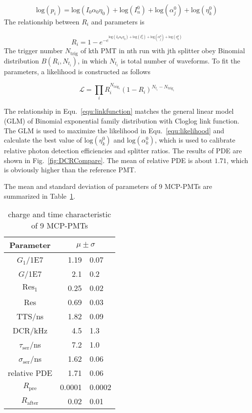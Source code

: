 \begin{equation}
    \label{equ:pdelograte}
    \mathrm{log}(p_{i})=\mathrm{log}(I_0\alpha_0\eta_0)+\mathrm{log}(I_n^0)+\mathrm{log}(\alpha_j^0)+\mathrm{log}(\eta_k^0)
\end{equation}
The relationship between $R_{i}$ and parameters is

\begin{equation}
    \label{equ:linkfunction}
    R_{i}=1-e^{-e^{\mathrm{log}(I_0\alpha_0\eta_0)+\mathrm{log}(I_n^0)+\mathrm{log}(\alpha_j^0)+\mathrm{log}(\eta_k^0)}}
\end{equation}
The trigger number $N_{\mathrm{trig}}$ of kth PMT in nth run with jth splitter obey Binomial distribution $B(R_{i},N_{t_{i}})$, in which $N_{t_{i}}$ is total number of waveforms. To fit the parameters, a likelihood is constructed as follows

\begin{equation}
    \label{equ:likelihood}
    \mathcal{L}=\prod_{i}{R_{i}^{N_{\mathrm{trig}_{i}}}(1-R_{i})^{N_{t_{i}}-N_{\mathrm{trig}_{i}}}}
\end{equation}

The relationship in Equ.~\eqref{equ:linkfunction} matches the general linear model (GLM) of Binomial exponential family distribution with Cloglog link function\cite{glm}. The GLM is used to maximize the likelihood in Equ.~\eqref{equ:likelihood} and calculate the best value of $\mathrm{log}(\eta_k^0)$ and $\mathrm{log}(\alpha_k^0)$, which is used to calibrate relative photon detection efficiencies and splitter ratios. The results of PDE are shown in Fig.~\ref{fig:DCRCompare}. The mean of relative PDE is about $1.71$, which is obviously higher than the reference PMT.

The mean and standard deviation of parameters of 9 MCP-PMTs are summarized in Table~\ref{tab:summary}.
\begin{table}
    \centering
    \caption{charge and time characteristic of 9 MCP-PMTs}
    \label{tab:summary}
    \begin{tabular}{c| r @{$\pm$} l}
        Parameter&\multicolumn{2}{c}{$\mu\pm\sigma$}\\
        \hline
        $G_1$/1E7&1.19&0.07\\
        $G$/1E7&2.1&0.2\\
        $\mathrm{Res}_1$&0.25&0.02\\
        Res&0.69&0.03\\
        TTS/ns&1.82&0.09\\
        DCR/kHz&4.5&1.3\\
        $\tau_{\mathrm{ser}}$/ns&7.2&1.0\\
        $\sigma_{\mathrm{ser}}$/ns&1.62&0.06\\
        relative PDE&1.71&0.06\\
        $R_{\mathrm{pre}}$&0.0001&0.0002\\
        $R_{\mathrm{after}}$&0.02&0.01\\
        \hline
    \end{tabular}
\end{table}
